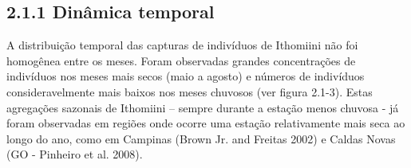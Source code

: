 \subsection{2.1.1 Dinâmica temporal} %
\label{sec:din-temp-borb}
A distribuição temporal das capturas de indivíduos de Ithomiini não foi homogênea entre os meses. Foram observadas grandes concentrações de indivíduos nos meses mais secos (maio a agosto) e números de indivíduos consideravelmente mais baixos nos meses chuvosos (ver figura 2.1-3). Estas agregações sazonais de Ithomiini – sempre durante a estação menos chuvosa - já foram observadas em regiões onde ocorre uma estação relativamente mais seca ao longo do ano, como em Campinas (Brown Jr. and Freitas 2002) e Caldas Novas (GO - Pinheiro et al. 2008). 

